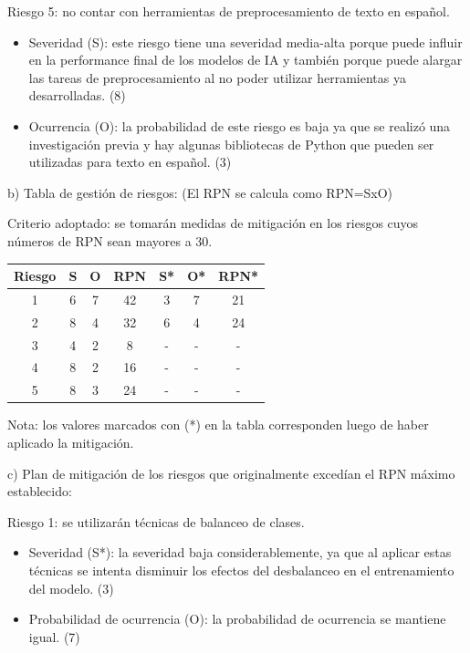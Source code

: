 \documentclass[
11pt, %
]{charter}
\begin{document}
Riesgo 5: no contar con herramientas de preprocesamiento de texto en español.
\begin{itemize}
	\item Severidad (S): este riesgo tiene una severidad media-alta porque puede influir en la performance final de los modelos de IA y también porque puede alargar las tareas de preprocesamiento al no poder utilizar herramientas ya desarrolladas. (8)
	\item Ocurrencia (O): la probabilidad de este riesgo es baja ya que se realizó una investigación previa y hay algunas bibliotecas de Python que pueden ser utilizadas para texto en español. (3)
\end{itemize}


b) Tabla de gestión de riesgos: (El RPN se calcula como RPN=SxO)

Criterio adoptado: 
se tomarán medidas de mitigación en los riesgos cuyos números de RPN sean mayores a 30.

\begin{table}[H]
\centering
\begin{tabular}{@{}|c|c|c|c|c|c|c|@{}}
\hline
\rowcolor[HTML]{C0C0C0} 
Riesgo &  S  &  O  &  RPN  &  S*  &  O*  &  RPN* \\ \hline
   1   &  6  &  7  &  42  &   3   &  7   &  21   \\ \hline
   2   &  8  &  4  &  32  &   6   &  4   &  24   \\ \hline
   3   &  4  &  2  &  8   &   -   &  -   &   -   \\ \hline
   4   &  8  &  2  &  16  &   -   &  -   &   -   \\ \hline
   5   &  8  &  3  &  24  &   -   &  -   &   -   \\ \hline
\end{tabular}%
\end{table}



Nota: los valores marcados con (*) en la tabla corresponden luego de haber aplicado la mitigación.

c) Plan de mitigación de los riesgos que originalmente excedían el RPN máximo establecido:
 
Riesgo 1: se utilizarán técnicas de balanceo de clases.
\begin{itemize}
	\item Severidad (S*): la severidad baja considerablemente, ya que al aplicar estas técnicas se intenta disminuir los efectos del desbalanceo en el entrenamiento del modelo. (3)
  	\item Probabilidad de ocurrencia (O): la probabilidad de ocurrencia se mantiene igual. (7)
\end{itemize}
\end{document}
